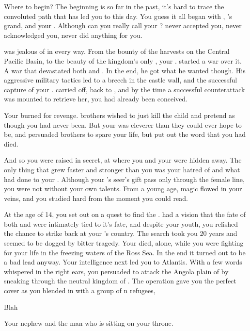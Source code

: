 \documentclass[char]{NeptuneBall}
\begin{document}
\name{\cManta{}}

Where to begin? The beginning is so far in the past, it's hard to trace the convoluted path that has led you to this day. You guess it all began with \cExExKing{\King} \cExExKing{}, \cExExKing{\King} \cKing{}'s grand\cExExKing{\parent}, and your \cExExKing{\parent}. Although can you really call \cExExKing{\them} your \cExExKing{\parent}? \cExExKing{\They} never accepted you, never acknowledged you, never did anything for you.

\cExExKing{\They} was jealous of \pPacifica{} in every way. From the bounty of the harvests on the Central Pacific Basin, to the beauty of the kingdom's only \cMother{\prince}, your \cMother{\parent} \cMother{\MYname}. \cExExKing{} started a war over it. A war that devastated both \pPacifica{} and \pAtlantis{}. In the end, he got what he wanted though. His aggressive military tactics led to a breech in the castle wall, and the successful capture of your \cMother{\parent}. \cExExKing{} carried \cMother{\them} off, back to \pAtlantis{}, and by the time a successful counterattack was mounted to retrieve her, you had already been conceived.

Your \cMother{\parent} burned for revenge. \cMother{\Them} brothers wished to just kill the child and pretend as though you had never been. But your \cMother{\parent} was cleverer than they could ever hope to be, and persuaded \cMother{\them} brothers to spare your life, but put out the word that you had died.

And so you were raised in secret, at \pAssassin{} where you and your \cMother{\parent} were hidden away. The only thing that grew faster and stronger than you was your hatred of \pAtlantis{} and what \cExExKing{} had done to your \cMother{\parent}. Although your \cMother{\parent}'s seer's gift pass only through the female line, you were not without your own talents. From a young age, magic flowed in your veins, and you studied hard from the moment you could read.

At the age of 14, you set out on a quest to find the \iTriton{\MYname}. \cMother{} had a vision that the fate of both \pPacifica{} and \pAtlantis{} were intimately tied to it's fate, and despite your youth, you relished the chance to strike back at your \cExExKing{\parent}'s country. The search took you 20 years and seemed to be dogged by bitter tragedy. Your \cMother{} died, alone, while you were fighting for your life in the freezing waters of the Ross Sea. In the end it turned out to be a bad lead anyway. Your intelligence next led you to Atlantis. With a few words whispered in the right ears, you persuaded \pPacifica{} to attack the Angola plain of \pAtlantis{} by sneaking through the neutral kingdom of \pIndia{}. The operation gave you the perfect cover as you blended in with a group of \pAtlantis{}n refugees, 

\begin{itemz}[Goals]
  \item Blah
\end{itemz}

\begin{contacts}
  \contact{\cKing{}} Your nephew and the man who is sitting on your throne.
\end{contacts}
\end{document}
